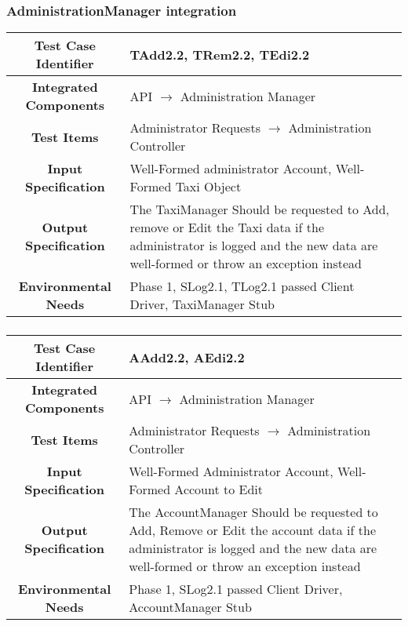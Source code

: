 \documentclass[11pt, a4paper,titlepage]{article}
\begin{document}
	 \subsubsection{AdministrationManager integration}
	\begin{tabularx}{\textwidth}{| c|X|}
	 		\hline \textbf{Test Case Identifier} & \label{TAdd2.2}TAdd2.2, \label{TRem2.2}TRem2.2, \label{TEdi2.2}TEdi2.2 \\
	 		\hline \textbf{Integrated Components} &  API $\rightarrow $ Administration Manager \\
	 		\hline \textbf{Test Items} &  Administrator Requests  $\rightarrow $ Administration Controller\\
	 		\hline \textbf{Input Specification} &  Well-Formed administrator Account, Well-Formed Taxi Object \\
	 		\hline \textbf{Output Specification} & The TaxiManager Should be requested to Add, remove or Edit the Taxi data if the administrator is logged and the new data are well-formed or throw an exception instead\\
	 		\hline \textbf{Environmental Needs} &  Phase 1, SLog2.1, TLog2.1 passed \newline 
	 		Client Driver, TaxiManager Stub\\
	 		\hline
	 \end{tabularx}
	 \newline
	 \subsubsection{}
	\begin{tabularx}{\textwidth}{| c|X|}
		 	\hline \textbf{Test Case Identifier} & \label{AAdd2.2}AAdd2.2, \label{AEdi2.2}AEdi2.2 \\
		 	\hline \textbf{Integrated Components} &  API $\rightarrow $ Administration Manager \\
		 	\hline \textbf{Test Items} &  Administrator Requests  $\rightarrow $ Administration Controller\\
		 	\hline \textbf{Input Specification} &  Well-Formed Administrator Account, Well-Formed Account to Edit \\
		 	\hline \textbf{Output Specification} & The AccountManager Should be requested to Add, Remove or Edit the account data if the administrator is logged and the new data are well-formed or throw an exception instead\\
		 	\hline \textbf{Environmental Needs} &  Phase 1, SLog2.1 passed \newline 
		 	Client Driver, AccountManager Stub\\
		 	\hline
		 \end{tabularx}
		 \newline
\end{document}
